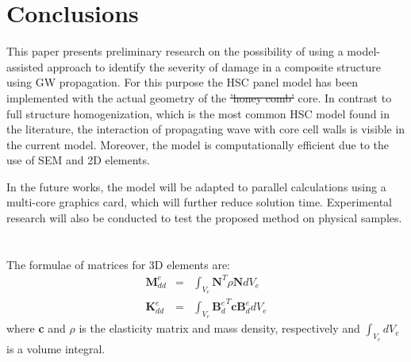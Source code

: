 \documentclass[materials,article,submit,moreauthors,pdftex]{Definitions/mdpi}
\providecommand{\DIFadd}[1]{{\protect\color{blue}{#1}}} %
\providecommand{\DIFdel}[1]{{\protect\color{red}\sout{#1}}}                      %
\providecommand{\DIFaddbegin}{} %
\providecommand{\DIFaddend}{} %
\providecommand{\DIFdelbegin}{} %
\providecommand{\DIFdelend}{} %
\begin{document}
\DIFaddend \section{Conclusions}
\label{sec:conc}
This paper presents preliminary research on the possibility of using a model-assisted approach to identify the severity of damage in a composite structure using GW propagation.
For this purpose the HSC panel model has been implemented with the actual geometry of the \DIFdelbegin \DIFdel{'honey comb' }\DIFdelend \DIFaddbegin \DIFadd{honeycomb }\DIFaddend core.
In contrast to  full structure homogenization, which is the most common HSC model found in the literature, the interaction of propagating wave with core cell walls is visible in the current model.
Moreover, the model is computationally efficient due to the use of SEM and 2D elements.

In the future works, the model will be adapted to parallel calculations using a multi-core graphics card, which will further reduce solution time. Experimental research will also be conducted to test the proposed method on physical samples.

\DIFaddbegin {}

\DIFaddend %
\appendix
\section{}
\label{app:matrices}
The formulae of matrices for 3D elements are:
\begin{eqnarray}
\textbf{M}_{dd}^e & = & \int_{V_e}\textbf{N}^T\rho \textbf{N} dV_e\\
\textbf{K}_{dd}^e & = & \int_{V_e}{\textbf{B}_d^e}^T\textbf{c}\textbf{B}_d^edV_e
\end{eqnarray}
where \textbf{c} and \(\rho\) is the elasticity matrix and mass density, respectively and \(\int_{V_e}dV_e\) is a volume integral.
\end{document}
